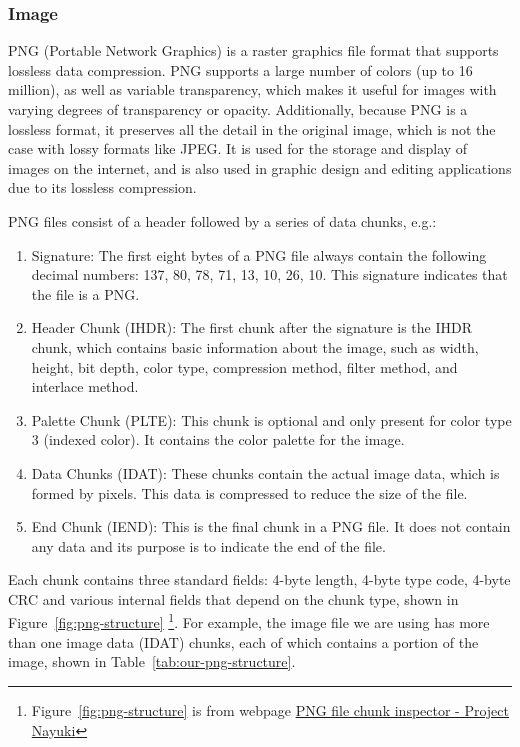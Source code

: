 \documentclass{article}
\begin{document}
\subsubsection{Image}
PNG (Portable Network Graphics) is a raster graphics file format that supports lossless data compression. 
PNG supports a large number of colors (up to 16 million), as well as variable transparency, which makes it useful for images with varying degrees of transparency or opacity. 
Additionally, because PNG is a lossless format, it preserves all the detail in the original image, which is not the case with lossy formats like JPEG. 
It is used for the storage and display of images on the internet, and is also used in graphic design and editing applications due to its lossless compression.

PNG files consist of a header followed by a series of data chunks, e.g.:
\begin{enumerate}
    \item Signature: The first eight bytes of a PNG file always contain the following decimal numbers: 137, 80, 78, 71, 13, 10, 26, 10. This signature indicates that the file is a PNG.
    \item Header Chunk (IHDR): The first chunk after the signature is the IHDR chunk, which contains basic information about the image, such as width, height, bit depth, color type, compression method, filter method, and interlace method.
    \item Palette Chunk (PLTE): This chunk is optional and only present for color type 3 (indexed color). It contains the color palette for the image.
    \item Data Chunks (IDAT): These chunks contain the actual image data, which is formed by pixels. This data is compressed to reduce the size of the file.
    \item End Chunk (IEND): This is the final chunk in a PNG file. It does not contain any data and its purpose is to indicate the end of the file.
\end{enumerate}
Each chunk contains three standard fields: 4-byte length, 4-byte type code, 4-byte CRC and various internal fields that depend on the chunk type, shown in Figure~\ref{fig:png-structure} \footnote{Figure~\ref{fig:png-structure} is from webpage \href{https://www.nayuki.io/res/dumb-png-output-java/png-file-format.svg}{PNG file chunk inspector - Project Nayuki}}. 
For example, the image file we are using has more than one image data (IDAT) chunks, each of which contains a portion of the image, shown in Table~\ref{tab:our-png-structure}.
\end{document}
